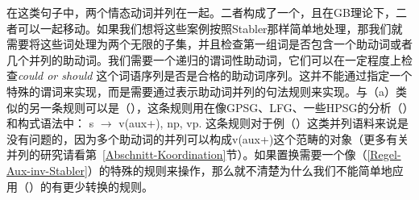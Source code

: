 \z
在这类句子中，两个情态动词并列在一起。二者构成了一个\xzero ，且在GB理论下，二者可以一起移动。如果我们想将这些案例按照Stabler那样简单地处理，那我们就需要将这些词处理为两个无限的子集，并且检查第一组词是否包含一个助动词或者几个并列的助动词。我们需要一个递归的谓词性助动词，它们可以在一定程度上检查\emph{could or should} 这个词语序列是否是合格的助动词序列。这并不能通过指定一个特殊的谓词来实现，而是需要通过表示助动词并列的句法规则来实现。与（a）类似的另一条规则可以是（），这条规则用在像GPSG\citep[]{GKPS85a}、LFG\citep[]{Falk84a-u}、一些HPSG的分析（\citealp[]{GSag2000a-u}）和构式语法中\citep{Fillmore99a}：
\ea
s $\to$ v(aux+), np, vp.
\z
这条规则对于例（）这类并列语料来说是没有问题的，因为多个助动词的并列可以构成v(aux+)这个范畴的对象（更多有关并列的研究请看第~\ref{Abschnitt-Koordination}节）。如果置换需要一个像（\ref{Regel-Aux-inv-Stabler}）的特殊的规则来操作，那么就不清楚为什么我们不能简单地应用（）的有更少转换的规则。

